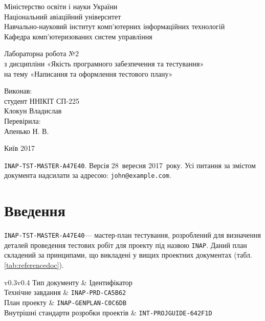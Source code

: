 \documentclass[a4paper,oneside,DIV=12,12pt]{scrartcl}
\newcommand\testplanid{\texttt{INAP-TST-MASTER-A47E40}}
\newcommand\projname{\texttt{INAP}}
\begin{document}
    \begin{titlepage}
    \begin{center}
	Міністерство освіти і науки України\\
	Національний авіаційний університет\\
	Навчально-науковий інститут комп'ютерних інформаційних технологій\\
	Кафедра комп'ютеризованих систем управління

	\vspace{\fill}

	Лабораторна робота №2\\
	з дисципліни «Якість програмного забезпечення та тестування»\\
	на тему «Написання та оформлення тестового плану»

	\vspace{\fill}
	
	\begin{flushright}
				Виконав:\\
				студент ННІКІТ СП-225\\
				Клокун Владислав\\
				Перевірила:\\
				Апенько Н. В.
	\end{flushright}

	Київ 2017

    \end{center}
    \end{titlepage}

	\noindent\testplanid. Версія 28~вересня 2017~року. Усі питання за змістом документа надсилати за адресою: \texttt{john@example.com}.
	
    \section{Введення}
		\testplanid --- мастер-план тестування, розроблений для визначення деталей проведення тестових робіт для проекту під назвою \projname. Даний план складений за принципами, що викладені у вищих проектних документах (табл. \ref{tab:referencedoc}).
	
		\begin{table}[h]
			\label{tab:referencedoc}
			\centering
			\begin{tabular}{v{0.3\textwidth}v{0.4\textwidth}}
				\toprule
				Тип документу & Ідентифікатор \\
				\midrule
				Технічне завдання & \texttt{INAP-PRD-CA5B62}\\
				План проекту & \texttt{INAP-GENPLAN-C0C6DB}\\
				Внутрішні стандарти розробки проектів & \texttt{INT-PROJGUIDE-642F1D}\\
				\bottomrule
			\end{tabular}
			\caption{Документи, на які спирається \testplanid}
		\end{table}
\end{document}
